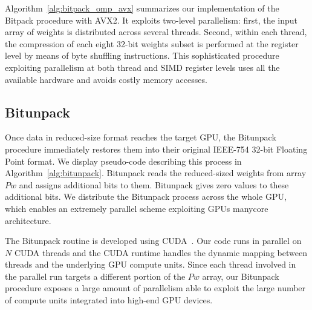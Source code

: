 Algorithm~\ref{alg:bitpack_omp_avx} summarizes our implementation of the Bitpack procedure with AVX2.
It exploits two-level parallelism: first, the input array of weights is distributed across several threads.
Second, within each thread, the compression of each eight 32-bit weights subset is performed at the register level by means of byte shuffling instructions.
This sophisticated procedure exploiting parallelism at both thread and SIMD register levels uses all the available hardware and avoids costly memory accesses.

\subsection{Bitunpack}
Once data in reduced-size format reaches the target GPU, the Bitunpack procedure immediately 
restores them into their original IEEE-754 32-bit Floating Point format. 
We display pseudo-code describing this process in Algorithm~\ref{alg:bitunpack}.
Bitunpack reads the reduced-sized weights from array $Pw$ and assigns additional bits to them. 
Bitunpack gives zero values to these additional bits.
We distribute the Bitunpack process across the whole GPU, which enables an extremely parallel scheme exploiting GPUs manycore architecture. 

The Bitunpack routine is developed using CUDA~\cite{cuda}. 
Our code  
runs in parallel on $N$ CUDA threads and the CUDA runtime handles the dynamic mapping between threads and the underlying GPU compute units.
Since each thread involved in the parallel run targets a different portion of the $Pw$ array, our Bitunpack procedure exposes a large amount of parallelism able to exploit the large number of compute units integrated into high-end GPU devices.

